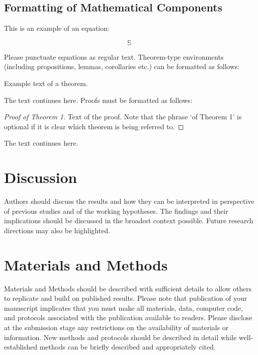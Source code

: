 \documentclass[entropy,article,submit,moreauthors,pdftex,10pt,a4paper]{mdpi}
\begin{document}
\subsection{Formatting of Mathematical Components}

This is an example of an equation:

\begin{equation}
\mathbb{S}
\end{equation}

Please punctuate equations as regular text. Theorem-type environments (including propositions, lemmas, corollaries etc.) can be formatted as follows:
\begin{Theorem}
Example text of a theorem.
\end{Theorem}

The text continues here. Proofs must be formatted as follows:

\begin{proof}[Proof of Theorem 1]
Text of the proof. Note that the phrase `of Theorem 1' is optional if it is clear which theorem is being referred to.
\end{proof}
The text continues here.

\section{Discussion}

Authors should discuss the results and how they can be interpreted in perspective of previous studies and of the working hypotheses. The findings and their implications should be discussed in the broadest context possible. Future research directions may also be highlighted.

\section{Materials and Methods}

Materials and Methods should be described with sufficient details to allow others to replicate and build on published results. Please note that publication of your manuscript implicates that you must make all materials, data, computer code, and protocols associated with the publication available to readers. Please disclose at the submission stage any restrictions on the availability of materials or information. New methods and protocols should be described in detail while well-established methods can be briefly described and appropriately cited.
\end{document}
